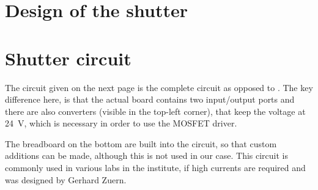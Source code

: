 \chapter{Design of the shutter}
\label{ch:shutter_design}

\chapter{Shutter circuit}
\label{ch:shutter_circuit}
The circuit given on the next page is the complete circuit as opposed to . The key difference here, is that the actual board contains two input/output ports and there are also converters (visible in the top-left corner), that keep the voltage at \SI{24}{\volt}, which is necessary in order to use the MOSFET driver.

The breadboard on the bottom are built into the circuit, so that custom additions can be made, although this is not used in our case. This circuit is commonly used in various labs in the institute, if high currents are required and was designed by Gerhard Zuern.


